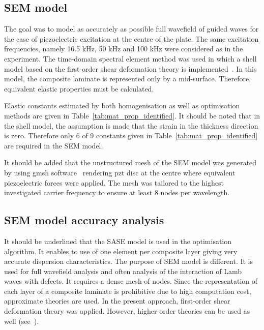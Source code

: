 \documentclass[preprint,12pt]{elsarticle}
\begin{document}
\subsection{SEM model}
The goal was to model as accurately as possible full wavefield of guided waves for the case of piezoelectric excitation at the centre of the plate. 
The same excitation frequencies, namely 16.5 kHz, 50 kHz and 100 kHz were considered as in the experiment. 
The time-domain spectral element method was used in which a shell model based on the first-order shear deformation theory is implemented~\cite{Kudela2020a}. 
In this model, the composite laminate is represented only by a mid-surface. Therefore, equivalent elastic properties must be calculated. 

Elastic constants estimated by both homogenisation as well as optimisation methods are given in Table~\ref{tab:mat_prop_identified}. 
It should be noted that in the shell model, the assumption is made that the strain in the thickness direction is zero. 
Therefore only 6 of 9 constants given in Table~\ref{tab:mat_prop_identified} are required in the SEM model.

It should be added that the unstructured mesh of the SEM model was generated by using gmsh software~\cite{Geuzaine2009} rendering pzt disc at the centre where equivalent piezoelectric forces were applied. 
The mesh was tailored to the highest investigated carrier frequency to ensure at least 8 nodes per wavelength.

\subsection{SEM model accuracy analysis}
It should be underlined that the SASE model is used in the optimisation algorithm. 
It enables to use of one element per composite layer giving very accurate dispersion characteristics. The purpose of SEM model is different. 
It is used for full wavefield analysis and often analysis of the interaction of Lamb waves with defects. 
It requires a dense mesh of nodes. 
Since the representation of each layer of a composite laminate is prohibitive due to high computation cost, approximate theories are used. 
In the present approach, first-order shear deformation theory was applied. 
However, higher-order theories can be used as well (see~\cite{Ostachowicz2012}).
\end{document}
